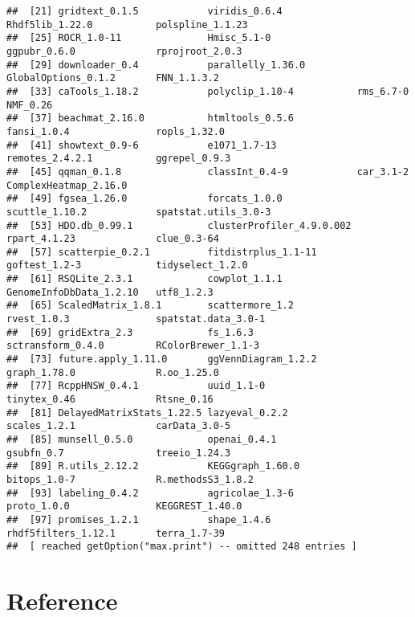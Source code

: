 \documentclass[
]{article}
\begin{document}
\begin{verbatim}
##  [21] gridtext_0.1.5            viridis_0.6.4             Rhdf5lib_1.22.0           polspline_1.1.23         
##  [25] ROCR_1.0-11               Hmisc_5.1-0               ggpubr_0.6.0              rprojroot_2.0.3          
##  [29] downloader_0.4            parallelly_1.36.0         GlobalOptions_0.1.2       FNN_1.1.3.2              
##  [33] caTools_1.18.2            polyclip_1.10-4           rms_6.7-0                 NMF_0.26                 
##  [37] beachmat_2.16.0           htmltools_0.5.6           fansi_1.0.4               ropls_1.32.0             
##  [41] showtext_0.9-6            e1071_1.7-13              remotes_2.4.2.1           ggrepel_0.9.3            
##  [45] qqman_0.1.8               classInt_0.4-9            car_3.1-2                 ComplexHeatmap_2.16.0    
##  [49] fgsea_1.26.0              forcats_1.0.0             scuttle_1.10.2            spatstat.utils_3.0-3     
##  [53] HDO.db_0.99.1             clusterProfiler_4.9.0.002 rpart_4.1.23              clue_0.3-64              
##  [57] scatterpie_0.2.1          fitdistrplus_1.1-11       goftest_1.2-3             tidyselect_1.2.0         
##  [61] RSQLite_2.3.1             cowplot_1.1.1             GenomeInfoDbData_1.2.10   utf8_1.2.3               
##  [65] ScaledMatrix_1.8.1        scattermore_1.2           rvest_1.0.3               spatstat.data_3.0-1      
##  [69] gridExtra_2.3             fs_1.6.3                  sctransform_0.4.0         RColorBrewer_1.1-3       
##  [73] future.apply_1.11.0       ggVennDiagram_1.2.2       graph_1.78.0              R.oo_1.25.0              
##  [77] RcppHNSW_0.4.1            uuid_1.1-0                tinytex_0.46              Rtsne_0.16               
##  [81] DelayedMatrixStats_1.22.5 lazyeval_0.2.2            scales_1.2.1              carData_3.0-5            
##  [85] munsell_0.5.0             openai_0.4.1              gsubfn_0.7                treeio_1.24.3            
##  [89] R.utils_2.12.2            KEGGgraph_1.60.0          bitops_1.0-7              R.methodsS3_1.8.2        
##  [93] labeling_0.4.2            agricolae_1.3-6           proto_1.0.0               KEGGREST_1.40.0          
##  [97] promises_1.2.1            shape_1.4.6               rhdf5filters_1.12.1       terra_1.7-39             
##  [ reached getOption("max.print") -- omitted 248 entries ]
\end{verbatim}

\hypertarget{bibliography}{%
\section*{Reference}\label{bibliography}}
\end{document}
